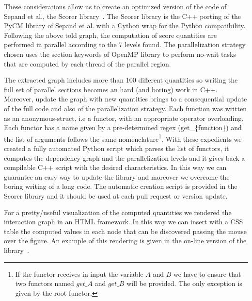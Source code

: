 \documentclass{standalone}
\begin{document}
These considerations allow us to create an optimized version of the code of Sepand et al., the \textsf{Scorer} library~\cite{Scorer}.
The \textsf{Scorer} library is the \textsf{C++} porting of the \textsf{PyCM} library of Sepand et al. with a \textsf{Cython} wrap for the \textsf{Python} compatibility.
Following the above told graph, the computation of score quantities are performed in parallel according to the 7 levels found.
The parallelization strategy chosen uses the \textsf{section} keywords of OpenMP library to perform no-wait tasks that are computed by each thread of the parallel region.

The extracted graph includes more than 100 different quantities so writing the full set of parallel sections becomes an hard (and boring) work in \textsf{C++}.
Moreover, update the graph with new quantities brings to a consequential update of the full code and also of the parallelization strategy.
Each function was written as an anonymous-struct, i.e a functor, with an appropriate operator overloading.
Each functor has a name given by a pre-determined regex (\textsf{get\_\{function\}}) and the list of arguments follows the same nomenclature\footnote{
  If the functor receives in input the variable $A$ and $B$ we have to ensure that two functors named $get\_A$ and $get\_B$ will be provided.
  The only exception is given by the root functor.
}.
With these expedients we created a fully automated \textsf{Python} script which parses the list of functors, it computes the dependency graph and the parallelization levels and it gives back a compilable \textsf{C++} script with the desired characteristics.
In this way we can guarantee an easy way to update the library and moreover we overcome the boring writing of a long code.
The automatic creation script is provided in the \textsf{Scorer} library and it should be used at each pull request or version update.

For a pretty/useful visualization of the computed quantities we rendered the interaction graph in an HTML framework.
In this way we can insert with a CSS table the computed values in each node that can be discovered passing the mouse over the figure.
An example of this rendering is given in the on-line version of the library~\cite{Scorer}.
\end{document}
